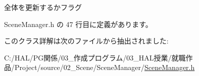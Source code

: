 全体を更新するかフラグ 



 Scene\+Manager.\+h の 47 行目に定義があります。



このクラス詳解は次のファイルから抽出されました\+:\begin{DoxyCompactItemize}
\item 
C\+:/\+H\+A\+L/\+P\+G関係/03\+\_\+作成プログラム/03\+\_\+\+H\+A\+L授業/就職作品/\+Project/source/02\+\_\+\+Scene/\+Scene\+Manager/\mbox{\hyperlink{_scene_manager_8h}{Scene\+Manager.\+h}}\end{DoxyCompactItemize}
